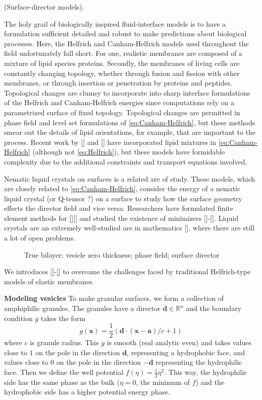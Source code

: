 (Surface-director models).

The holy grail of biologically inspired fluid-interface models is
to have a formulation sufficient detailed and robust to make predictions
about biological processes.  Here, the Helfrich and Canham-Helfrich models
used throughout the field unfortunately fall short. For one,
realistic membranes are composed of a mixture of lipid species proteins.
Secondly, the membranes of living cells are constantly changing topology,
whether through fusion and fission with other membranes, or through
insertion or penetration by proteins and peptides.  Topological
changes are clumsy to incorporate into 
sharp interface formulations of the Helfrich and Canham-Helfrich energies
since computations rely on a parametrized surface of fixed topology.
Topological changes are permitted in phase field and level set formulations
of \eqref{eq:Canham-Helfrich}, but these methods smear out the 
details of lipid orientations, for example, that are important to the
process.  Recent work by [] and [] have incorporated lipid mixtures in \eqref{eq:Canham-Helfrich}
(although not \eqref{eq:Helfrich}), but these models have formidable complexity
due to the additional constraints and transport equations involved.

Nematic liquid crystals on surfaces is a related are of study.  These models,
which are closely related to \eqref{eq:Canham-Helfrich}, consider the energy
of a nematic liquid crystal (or Q-tensor ?) on a surface to study how the
surface geometry effects the director field and vice versa. Researchers
have formulated finite element methods for [][] and studied the existence
of minimizers []-[].  Liquid crystals are an extremely well-studied
are in mathematics [], where there are still a lot of open problems.

\begin{figure}
True bilayer; vesicle zero thickness; phase field; surface director
\end{figure}

We introduces \eqref{}-\eqref{} to overcome the challenges faced by
traditional Helfrich-type models of elastic membranes.

\noindent\textbf{Modeling vesicles} To make granular surfaces, we
form a collection of amphiphilic granules.  The granules have a
director $\mathbf{d} \in \mathbb{R}^n$ and the boundary condition
$g$ takes the form
\begin{equation}
g(\mathbf{x}) = \frac{1}{2}(\mathbf{d}\cdot(\mathbf{x}-\mathbf{a})/c + 1)
\end{equation}
where $c$ is granule radius.
This $g$ is smooth (real analytic even)
and takes values close to $1$ on the pole in the direction $\mathbf{d}$,
representing a hydrophobic face, and values close to $0$ on the pole
in the direction $-\mathbf{d}$ representing the hydrophilic face.
Then we define the well potential $f(\eta) = \tfrac{1}{2}\eta^2.$
This way, the hydrophilic side has the same phase as the bulk
($\eta = 0$, the minimum of $f$) and the hydrophobic side has
a higher potential energy phase.

